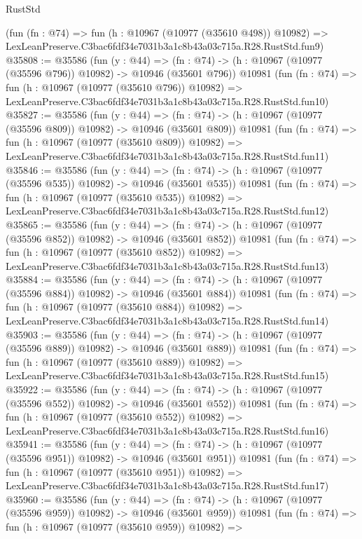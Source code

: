 \begin{lexlean}{RustStd}
\begin{coremodule}
    (fun (fn : @74) =>
    fun (h : @10967 (@10977 (@35610 @498)) @10982) =>
    LexLeanPreserve.C3bac6fdf34e7031b3a1c8b43a03c715a.R28.RustStd.fun9)
@35808 := @35586
    (fun (y : @44) =>
    (fn : @74) -> (h : @10967 (@10977 (@35596 @796)) @10982) -> @10946 (@35601 @796))
    @10981
    (fun (fn : @74) =>
    fun (h : @10967 (@10977 (@35610 @796)) @10982) =>
    LexLeanPreserve.C3bac6fdf34e7031b3a1c8b43a03c715a.R28.RustStd.fun10)
@35827 := @35586
    (fun (y : @44) =>
    (fn : @74) -> (h : @10967 (@10977 (@35596 @809)) @10982) -> @10946 (@35601 @809))
    @10981
    (fun (fn : @74) =>
    fun (h : @10967 (@10977 (@35610 @809)) @10982) =>
    LexLeanPreserve.C3bac6fdf34e7031b3a1c8b43a03c715a.R28.RustStd.fun11)
@35846 := @35586
    (fun (y : @44) =>
    (fn : @74) -> (h : @10967 (@10977 (@35596 @535)) @10982) -> @10946 (@35601 @535))
    @10981
    (fun (fn : @74) =>
    fun (h : @10967 (@10977 (@35610 @535)) @10982) =>
    LexLeanPreserve.C3bac6fdf34e7031b3a1c8b43a03c715a.R28.RustStd.fun12)
@35865 := @35586
    (fun (y : @44) =>
    (fn : @74) -> (h : @10967 (@10977 (@35596 @852)) @10982) -> @10946 (@35601 @852))
    @10981
    (fun (fn : @74) =>
    fun (h : @10967 (@10977 (@35610 @852)) @10982) =>
    LexLeanPreserve.C3bac6fdf34e7031b3a1c8b43a03c715a.R28.RustStd.fun13)
@35884 := @35586
    (fun (y : @44) =>
    (fn : @74) -> (h : @10967 (@10977 (@35596 @884)) @10982) -> @10946 (@35601 @884))
    @10981
    (fun (fn : @74) =>
    fun (h : @10967 (@10977 (@35610 @884)) @10982) =>
    LexLeanPreserve.C3bac6fdf34e7031b3a1c8b43a03c715a.R28.RustStd.fun14)
@35903 := @35586
    (fun (y : @44) =>
    (fn : @74) -> (h : @10967 (@10977 (@35596 @889)) @10982) -> @10946 (@35601 @889))
    @10981
    (fun (fn : @74) =>
    fun (h : @10967 (@10977 (@35610 @889)) @10982) =>
    LexLeanPreserve.C3bac6fdf34e7031b3a1c8b43a03c715a.R28.RustStd.fun15)
@35922 := @35586
    (fun (y : @44) =>
    (fn : @74) -> (h : @10967 (@10977 (@35596 @552)) @10982) -> @10946 (@35601 @552))
    @10981
    (fun (fn : @74) =>
    fun (h : @10967 (@10977 (@35610 @552)) @10982) =>
    LexLeanPreserve.C3bac6fdf34e7031b3a1c8b43a03c715a.R28.RustStd.fun16)
@35941 := @35586
    (fun (y : @44) =>
    (fn : @74) -> (h : @10967 (@10977 (@35596 @951)) @10982) -> @10946 (@35601 @951))
    @10981
    (fun (fn : @74) =>
    fun (h : @10967 (@10977 (@35610 @951)) @10982) =>
    LexLeanPreserve.C3bac6fdf34e7031b3a1c8b43a03c715a.R28.RustStd.fun17)
@35960 := @35586
    (fun (y : @44) =>
    (fn : @74) -> (h : @10967 (@10977 (@35596 @959)) @10982) -> @10946 (@35601 @959))
    @10981
    (fun (fn : @74) =>
    fun (h : @10967 (@10977 (@35610 @959)) @10982) =>

\end{coremodule}
\end{lexlean}
